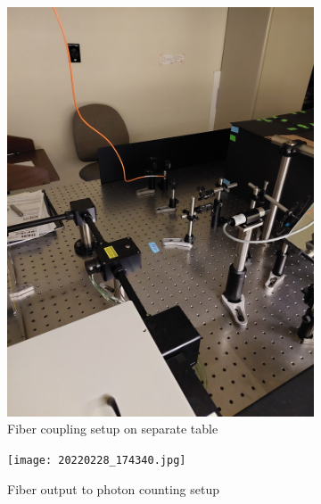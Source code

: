 \documentclass[a4paper]{article}
\begin{document}
\begin{figure}[!htb]
     \centering
     \begin{subfigure}[t]{0.25\textwidth}
         \centering
         \includegraphics[angle=270,origin=c,width=\textwidth]{20220228_174444.jpg}
         \caption{Fiber coupling setup on separate table}
         \label{fig:nkt_fiber_coupling}
     \end{subfigure}
     \hfill
     \begin{subfigure}[t]{0.25\textwidth}
         \centering
         \texttt{[image: 20220228\_174340.jpg]}
         \caption{Fiber output to photon counting setup}
         \label{fig:fiber_output}
     \end{subfigure}
     \hfill
     \begin{subfigure}[t]{0.4\textwidth}
         \centering

\end{subfigure}
\end{figure}
\end{document}
